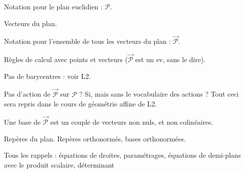Notation pour le plan euclidien : $\mathcal P$.

Vecteurs du plan.

Notation pour l'ensemble de tous les vecteurs du plan : $\overrightarrow{\mathcal P}$.

Règles de calcul avec points et vecteurs ($\overrightarrow{\mathcal P}$ est un ev, sans le dire).

Pas de barycentres : voir L2.

Pas d'action de $\overrightarrow{\mathcal P}$ sur $\mathcal P$ ? Si, mais sans le vocabulaire des actions ?
Tout ceci sera repris dans le cours de géométrie affine de L2.

\begin{definition}
Une base de $\overrightarrow{\mathcal P}$ est un couple de vecteurs non nuls, et non colinéaires.
\end{definition}

Repères du plan. Repères orthonormés, bases orthonormées.

Tous les rappels : équations de droites, paramétrages, équations de demi-plans avec le produit scalaire, déterminant